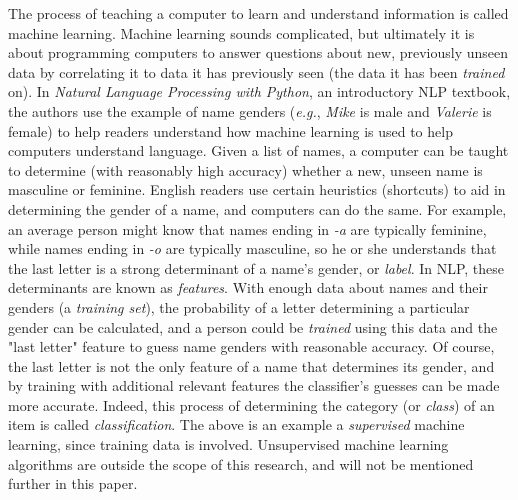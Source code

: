The process of teaching a computer to learn and understand information is called machine learning.
Machine learning sounds complicated, but ultimately it is about programming computers to answer questions about new, previously unseen data by correlating it to data it has previously seen (the data it has been {\it trained} on).
In {\it Natural Language Processing with Python}, an introductory NLP textbook, the authors use the example of name genders ({\it e.g.}, {\it Mike} is male and {\it Valerie} is female) to help readers understand how machine learning is used to help computers understand language\cite{nlpwp}.
Given a list of names, a computer can be taught to determine (with reasonably high accuracy) whether a new, unseen name is masculine or feminine.
English readers use certain heuristics (shortcuts) to aid in determining the gender of a name, and computers can do the same.
For example, an average person might know that names ending in {\it -a} are typically feminine, while names ending in {\it -o} are typically masculine, so he or she understands that the last letter is a strong determinant of a name's gender, or {\it label}.
In NLP, these determinants are known as {\it features}.
With enough data about names and their genders (a {\it training set}), the probability of a letter determining a particular gender can be calculated, and a person could be {\it trained} using this data and the "last letter" feature to guess name genders with reasonable accuracy.
Of course, the last letter is not the only feature of a name that determines its gender, and by training with additional relevant features the classifier's guesses can be made more accurate.
Indeed, this process of determining the category (or {\it class}) of an item is called {\it classification}.
The above is an example a {\it supervised} machine learning, since training data is involved.
Unsupervised machine learning algorithms are outside the scope of this research, and will not be mentioned further in this paper.


